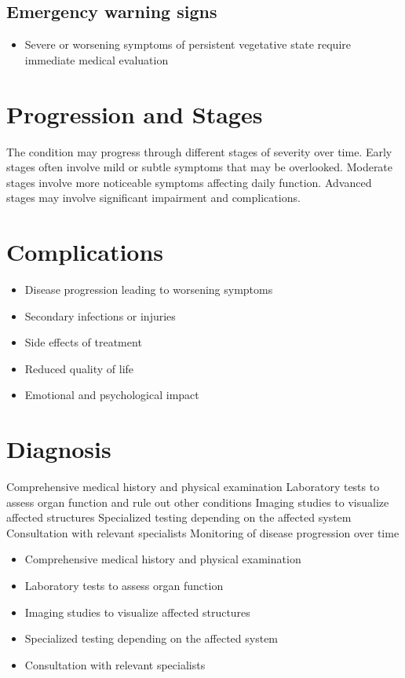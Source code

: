 \subsection{Emergency warning signs}
\begin{itemize}[noitemsep]
  \item Severe or worsening symptoms of persistent vegetative state require immediate medical evaluation
\end{itemize}
\section{Progression and Stages}
The condition may progress through different stages of severity over time. Early stages often involve mild or subtle symptoms that may be overlooked. Moderate stages involve more noticeable symptoms affecting daily function. Advanced stages may involve significant impairment and complications.
\section{Complications}
\begin{itemize}[noitemsep]
  \item Disease progression leading to worsening symptoms
  \item Secondary infections or injuries
  \item Side effects of treatment
  \item Reduced quality of life
  \item Emotional and psychological impact
\end{itemize}
\section{Diagnosis}
Comprehensive medical history and physical examination Laboratory tests to assess organ function and rule out other conditions Imaging studies to visualize affected structures Specialized testing depending on the affected system Consultation with relevant specialists Monitoring of disease progression over time

\begin{itemize}[noitemsep]
  \item Comprehensive medical history and physical examination
  \item Laboratory tests to assess organ function
  \item Imaging studies to visualize affected structures
  \item Specialized testing depending on the affected system
  \item Consultation with relevant specialists
\end{itemize}
